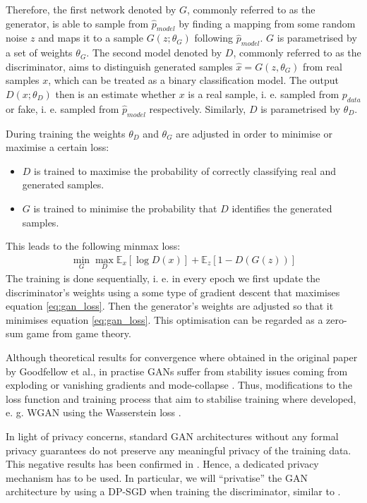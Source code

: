 Therefore, the first network denoted by $G$, commonly referred to as the generator, is able to sample from $\hat{p}_{model}$ by finding a mapping from some random noise $z$ and maps it to a sample $G(z; \theta_G)$ following $\hat{p}_{model}$. $G$ is parametrised by a set of weights $\theta_G$. The second model denoted by $D$, commonly referred to as the discriminator, aims to distinguish generated samples $\hat{x}= G(z,\theta_G)$ from real samples $x$, which can be treated as a binary classification model. The output $D(x; \theta_D)$ then is an estimate whether $x$ is a real sample, i. e. sampled from $p_{data}$ or fake, i. e. sampled from $\hat{p}_{model}$ respectively. Similarly, $D$ is parametrised by $\theta_D$.

During training the weights $\theta_D$ and $\theta_G$ are adjusted in order to minimise or maximise a certain loss:
\begin{itemize}
    \item $D$ is trained to maximise the probability of correctly classifying real and generated samples.
    \item $G$ is trained to minimise the probability that $D$ identifies the generated samples.
\end{itemize}

This leads to the following minmax loss:
\begin{align} \label{eq:gan_loss}
    \min_G \max_D \mathbb{E}_x[\log D(x)] + \mathbb{E}_z[1-D(G(z))]
\end{align}
The training is done sequentially, i. e. in every epoch we first update the discriminator's weights using a some type of gradient descent that maximises equation \ref{eq:gan_loss}. Then the generator's weights are adjusted so that it minimises equation \ref{eq:gan_loss}. This optimisation can be regarded as a zero-sum game from game theory. 

Although theoretical results for convergence where obtained in the original paper by Goodfellow et al., in practise GANs suffer from stability issues coming from exploding or vanishing gradients and mode-collapse \parencite[see][for in-depth review]{gui2020review,jabbar2020survey}. Thus, modifications to the loss function and training process that aim to stabilise training where developed, e. g. WGAN using the Wasserstein loss \parencite{arjovsky2017wasserstein}.

In light of privacy concerns, standard GAN architectures without any formal privacy guarantees do not preserve any meaningful privacy of the training data. This negative results has been confirmed in \parencite{lin2021privacy,stadler2022synthetic}. Hence, a dedicated privacy mechanism has to be used. In particular, we will ``privatise'' the GAN architecture by using a DP-SGD when training the discriminator, similar to \parencite{xie2018differentially}.

